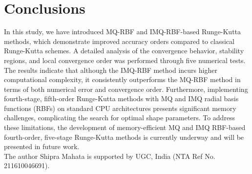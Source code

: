 \documentclass[a4paper, preprint,11pt]{elsarticle}
\numberwithin{equation}{section}
\begin{document}
\section{Conclusions}
In this study, we have introduced MQ-RBF and IMQ-RBF-based Runge-Kutta methods, which demonstrate improved accuracy orders compared to classical Runge-Kutta schemes. A detailed analysis of the convergence behavior, stability regions, and local convergence order was performed through five numerical tests. The results indicate that although the IMQ-RBF method incurs higher computational complexity, it consistently outperforms the MQ-RBF method in terms of both numerical error and convergence order. Furthermore, implementing fourth-stage, fifth-order Runge-Kutta methods with MQ and IMQ radial basis functions (RBFs) on standard CPU architectures presents significant memory challenges, complicating the search for optimal shape parameters. To address these limitations, the development of memory-efficient MQ and IMQ RBF-based fourth-order, five-stage Runge-Kutta methods is currently underway and will be presented in future work.\\
\newline
{}
The author Shipra Mahata is supported by UGC, India (NTA
Ref No. 211610046691).\\
  

\end{document}
